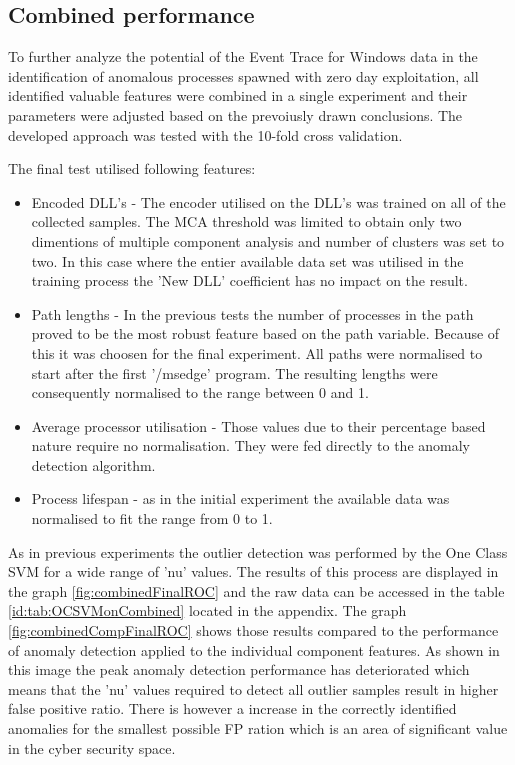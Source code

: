 \documentclass[a4paper,twoside,12pt]{book}
\begin{document}
\subsection{Combined performance}

To further analyze the potential of the Event Trace for Windows data in the identification of
anomalous processes spawned with zero day exploitation, all identified valuable features were
combined in a single experiment and their parameters were adjusted based on the prevoiusly drawn 
conclusions. The developed approach was tested with the 10-fold cross validation.

The final test utilised following features:
\begin{itemize}
	\item Encoded DLL's - The encoder utilised on the DLL's was trained on all of the collected samples. The MCA 
	threshold was limited to obtain only two dimentions of multiple component analysis and number of clusters was set 
	to two. In this case where the entier available data set was utilised in the training process the 'New DLL'
	coefficient has no impact on the result.  
	\item Path lengths - In the previous tests the number of processes in the path proved to be the most robust feature
	based on the path variable. Because of this it was choosen for the final experiment. All paths were normalised to start
	after the first '/msedge' program. The resulting lengths were consequently normalised to the range between 0 and 1.
	\item Average processor utilisation - Those values due to their percentage based nature require no normalisation. They 
	were fed directly to the anomaly detection algorithm. 
	\item Process lifespan - as in the initial experiment the available data was normalised to fit the range from 0 to 1.
\end{itemize}

As in previous experiments the outlier detection was performed by the One Class SVM for a wide range of 'nu' values. The results of 
this process are displayed in the graph \ref{fig:combinedFinalROC} and the raw data can be accessed in the table 
\ref{id:tab:OCSVMonCombined} located in the appendix. The graph \ref{fig:combinedCompFinalROC} shows those results compared to 
the performance of anomaly detection applied to the individual component features. As shown in this image the peak anomaly
detection performance has deteriorated which means that the 'nu' values required to detect all outlier samples result in higher
false positive ratio. There is however a increase in the correctly identified anomalies for the smallest possible FP ration which 
is an area of significant value in the cyber security space.
\end{document}
